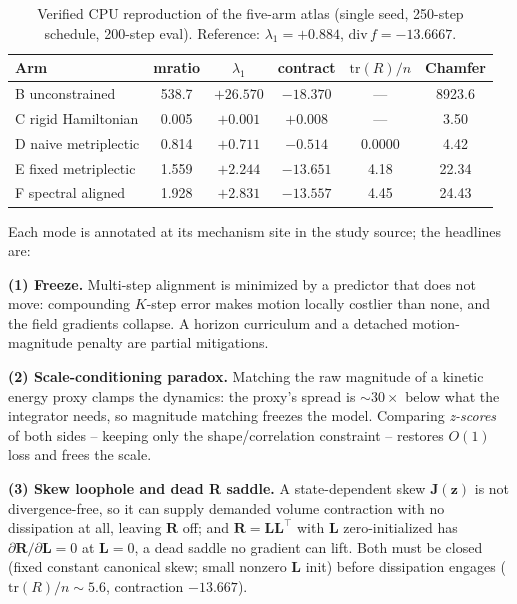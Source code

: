 \documentclass[journal]{IEEEtran}
\newcommand{\zdyn}{\boldsymbol{z}}
\begin{document}
\begin{table}[t]
\caption{Verified CPU reproduction of the five-arm atlas (single seed,
250-step schedule, 200-step eval). Reference: $\lambda_1=+0.884$,
$\mathrm{div}\,f=-13.6667$.}
\label{tab:repro}
\centering
\small
\begin{tabular}{@{}lccccc@{}}
\toprule
Arm & mratio & $\lambda_1$ & contract & $\mathrm{tr}(R)/n$ & Chamfer \\
\midrule
B unconstrained & 538.7 & $+26.570$ & $-18.370$ & --- & 8923.6 \\
C rigid Hamiltonian & 0.005 & $+0.001$ & $+0.008$ & --- & 3.50 \\
D naive metriplectic & 0.814 & $+0.711$ & $-0.514$ & 0.0000 & 4.42 \\
E fixed metriplectic & 1.559 & $+2.244$ & $-13.651$ & 4.18 & 22.34 \\
F spectral aligned & 1.928 & $+2.831$ & $-13.557$ & 4.45 & 24.43 \\
\bottomrule
\end{tabular}
\end{table}

Each mode is annotated at its mechanism site in the study source; the
headlines are:

\textbf{(1) Freeze.} Multi-step alignment is minimized by a predictor that
does not move: compounding $K$-step error makes motion locally costlier than
none, and the field gradients collapse. A horizon curriculum and a detached
motion-magnitude penalty are partial mitigations.

\textbf{(2) Scale-conditioning paradox.} Matching the raw magnitude of a
kinetic energy proxy clamps the dynamics: the proxy's spread is $\sim30\times$
below what the integrator needs, so magnitude matching freezes the model.
Comparing \emph{z-scores} of both sides -- keeping only the shape/correlation
constraint -- restores $O(1)$ loss and frees the scale.

\textbf{(3) Skew loophole and dead R saddle.} A state-dependent skew
$\mathbf{J}(\zdyn)$ is not divergence-free, so it can supply demanded volume
contraction with no dissipation at all, leaving $\mathbf{R}$ off; and
$\mathbf{R} = \mathbf{L}\mathbf{L}^\top$ with $\mathbf{L}$ zero-initialized
has $\partial \mathbf{R}/\partial \mathbf{L} = 0$ at $\mathbf{L}=0$, a dead
saddle no gradient can lift. Both must be closed (fixed constant canonical
skew; small nonzero $\mathbf{L}$ init) before dissipation engages
($\mathrm{tr}(R)/n \sim 5.6$, contraction $-13.667$).
\end{document}
